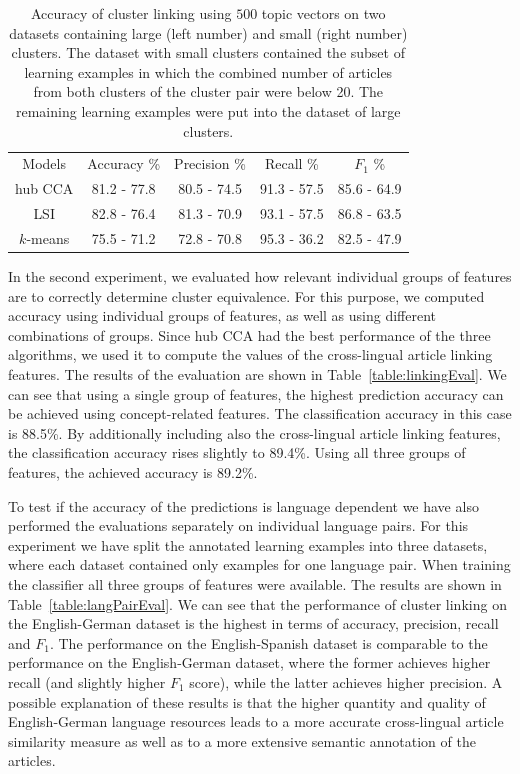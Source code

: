 \begin{table}[t]
\caption[Accuracy of cluster linking: large vs small clusters]{Accuracy of cluster linking using $500$ topic vectors on two datasets containing large (left number)
and small (right number) clusters. The dataset with small clusters contained the subset of
learning examples in which the combined number of articles from both clusters of the cluster
pair were below 20. The remaining learning examples were put into the dataset of large clusters.}
\begin{center}
\begin{tabular}{|c|c|c|c|c|}
  \hline
  \cline{1-5}
  Models & Accuracy \% & Precision \% & Recall \% & $F_1$ \% \\ \cline{1-5}
  hub CCA  & 81.2 - 77.8 & 80.5 - 74.5 & 91.3 - 57.5 & 85.6 - 64.9 \\ \cline{1-5}
  LSI      & 82.8 - 76.4 & 81.3 - 70.9 & 93.1 - 57.5 & 86.8 - 63.5 \\ \cline{1-5}
 $k$-means & 75.5 - 71.2 & 72.8 - 70.8 & 95.3 - 36.2 & 82.5 - 47.9 \\ \cline{1-5}
\end{tabular}
\end{center}
\label{table:linkingEvalAlgosLargeSmall}
\end{table}

In the second experiment, we evaluated how relevant individual groups of features are
to correctly determine cluster equivalence. For this purpose, we computed accuracy using
individual groups of features, as well as using different combinations of groups.
Since hub CCA had the best performance of the three algorithms, we used it to compute
the values of the cross-lingual article linking features. The results of the evaluation
are shown in Table~\ref{table:linkingEval}. We can see that using a single group of features,
the highest prediction accuracy can be achieved using concept-related features.
The classification accuracy in this case is 88.5\%. By additionally including also the
cross-lingual article linking features, the classification accuracy rises slightly
to 89.4\%. Using all three groups of features, the achieved accuracy is 89.2\%.

To test if the accuracy of the predictions is language dependent we have also
performed the evaluations separately on individual language pairs. For this
experiment we have split the annotated learning examples into three datasets,
where each dataset contained only examples for one language pair. When
training the classifier all three groups of features were available. The
results are shown in Table~\ref{table:langPairEval}. We can see that the
performance of cluster linking on the English-German dataset is the highest
in terms of accuracy, precision, recall and $F_1$. The performance on the
English-Spanish dataset is comparable to the performance on the English-German
dataset, where the former achieves higher recall (and slightly higher $F_1$ score),
while the latter achieves higher precision. A possible explanation of these
results is that the higher quantity and quality of English-German language
resources leads to a more accurate cross-lingual article similarity measure
as well as to a more extensive semantic annotation of the articles.


